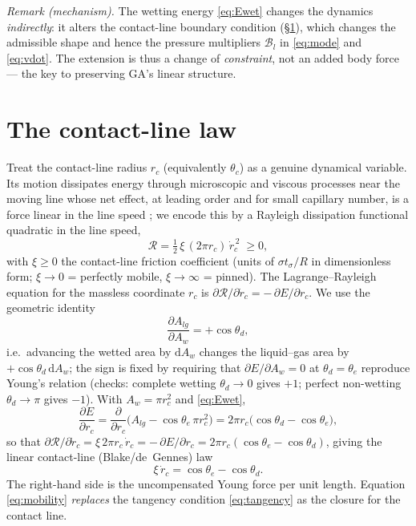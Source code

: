 \documentclass{jfm}
\newcommand{\be}{\begin{equation}}
\newcommand{\ee}{\end{equation}}
\begin{document}
\noindent\emph{Remark (mechanism).} The wetting energy \eqref{eq:Ewet} changes the
dynamics \emph{indirectly}: it alters the contact-line boundary condition
(\S\ref{sec:mobility}), which changes the admissible shape and hence the pressure
multipliers $\mathscr B_l$ in \eqref{eq:mode} and \eqref{eq:vdot}. The extension is thus
a change of \emph{constraint}, not an added body force --- the key to preserving GA's
linear structure.

\section{The contact-line law}\label{sec:mobility}

Treat the contact-line radius $r_c$ (equivalently $\theta_c$) as a genuine dynamical
variable. Its motion dissipates energy through microscopic and viscous processes near
the moving line whose net effect, at leading order and for small capillary number, is a
force linear in the line speed \citep{Blake2006,deGennes1985,Cox1986,Voinov1976}; we
encode this by a Rayleigh dissipation functional quadratic in the line speed,
\be\label{eq:rayleigh}
\mathcal R=\tfrac12\,\xi\,(2\pi r_c)\,\dot r_c^{\,2}\;\ge0,
\ee
with $\xi\ge0$ the contact-line friction coefficient (units of $\sigma t_\sigma/R$ in
dimensionless form; $\xi\to0$ = perfectly mobile, $\xi\to\infty$ = pinned). The
Lagrange--Rayleigh equation for the massless coordinate $r_c$ is
$\partial\mathcal R/\partial\dot r_c=-\,\partial E/\partial r_c$. We use the geometric
identity
\be\label{eq:dAlg}
\frac{\partial A_{lg}}{\partial A_w}=+\cos\theta_d,
\ee
i.e.\ advancing the wetted area by $\mathrm dA_w$ changes the liquid--gas area by
$+\cos\theta_d\,\mathrm dA_w$; the sign is fixed by requiring that
$\partial E/\partial A_w=0$ at $\theta_d=\theta_e$ reproduce Young's relation
(checks: complete wetting $\theta_d\to0$ gives $+1$; perfect non-wetting
$\theta_d\to\pi$ gives $-1$). With $A_w=\pi r_c^2$ and \eqref{eq:Ewet},
\be
\frac{\partial E}{\partial r_c}
=\frac{\partial}{\partial r_c}\big(A_{lg}-\cos\theta_e\,\pi r_c^2\big)
=2\pi r_c\big(\cos\theta_d-\cos\theta_e\big),
\ee
so that
$\partial\mathcal R/\partial\dot r_c=\xi\,2\pi r_c\,\dot r_c
=-\,\partial E/\partial r_c=2\pi r_c(\cos\theta_e-\cos\theta_d)$, giving the linear
contact-line (Blake/de~Gennes) law
\be\label{eq:mobility}
\boxed{\;\xi\,\dot r_c=\cos\theta_e-\cos\theta_d.\;}
\ee
The right-hand side is the uncompensated Young force per unit length. Equation
\eqref{eq:mobility} \emph{replaces} the tangency condition \eqref{eq:tangency} as the
closure for the contact line.
\end{document}

